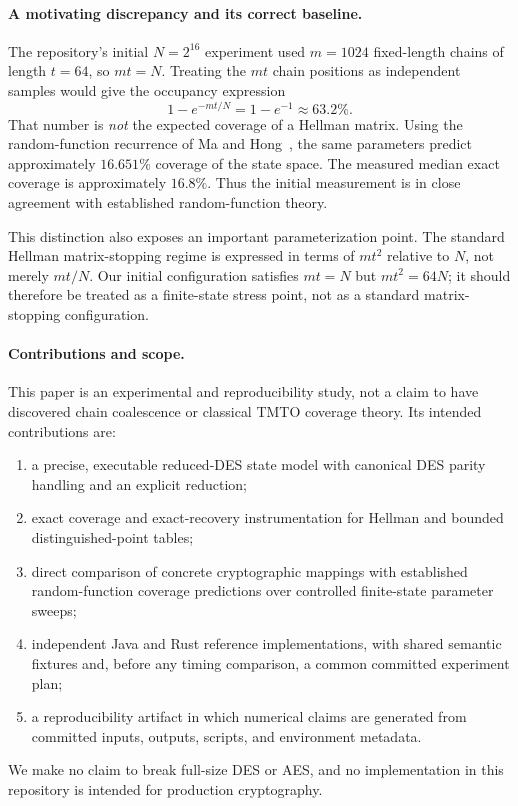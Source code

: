 \paragraph{A motivating discrepancy and its correct baseline.}
The repository's initial $N=2^{16}$ experiment used $m=1024$ fixed-length
chains of length $t=64$, so $mt=N$.  Treating the $mt$ chain positions as
independent samples would give the occupancy expression
\[
    1-e^{-mt/N}=1-e^{-1}\approx 63.2\%.
\]
That number is \emph{not} the expected coverage of a Hellman matrix.  Using the
random-function recurrence of Ma and Hong~\cite{MaHong2009}, the same
parameters predict approximately $16.651\%$ coverage of the state space.  The
measured median exact coverage is approximately $16.8\%$.  Thus the initial
measurement is in close agreement with established random-function theory.

This distinction also exposes an important parameterization point.  The
standard Hellman matrix-stopping regime is expressed in terms of $m t^2$
relative to $N$, not merely $mt/N$.  Our initial configuration satisfies
$mt=N$ but $m t^2=64N$; it should therefore be treated as a finite-state stress
point, not as a standard matrix-stopping configuration.

\paragraph{Contributions and scope.}
This paper is an experimental and reproducibility study, not a claim to have
discovered chain coalescence or classical TMTO coverage theory.  Its intended
contributions are:
\begin{enumerate}
  \item a precise, executable reduced-DES state model with canonical DES parity
        handling and an explicit reduction;
  \item exact coverage and exact-recovery instrumentation for Hellman and
        bounded distinguished-point tables;
  \item direct comparison of concrete cryptographic mappings with established
        random-function coverage predictions over controlled finite-state
        parameter sweeps;
  \item independent Java and Rust reference implementations, with shared
        semantic fixtures and, before any timing comparison, a common committed
        experiment plan;
  \item a reproducibility artifact in which numerical claims are generated from
        committed inputs, outputs, scripts, and environment metadata.
\end{enumerate}

We make no claim to break full-size DES or AES, and no implementation in this
repository is intended for production cryptography.
